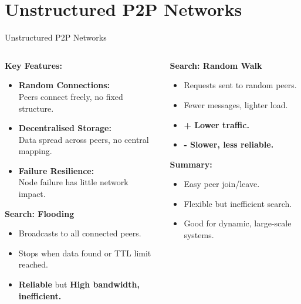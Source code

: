 \documentclass[aspectratio=169, table]{beamer}
\begin{document}
\section{Unstructured P2P Networks}

\begin{frame}{Unstructured P2P Networks}
	\vspace{20pt}
	\begin{columns}[t]
		
		\begin{column}{0.6\textwidth}
			\textbf{Key Features:}
			\begin{itemize}
				\item \textbf{Random Connections:} \\
				Peers connect freely, no fixed structure.
				
				\item \textbf{Decentralised Storage:} \\
				Data spread across peers, no central mapping.
				
				\item \textbf{Failure Resilience:} \\
				Node failure has little network impact.
			\end{itemize}
			
			\textbf{Search: Flooding}
			\begin{itemize}
				\item Broadcasts to all connected peers.
				\item Stops when data found or TTL limit reached.
				\item \textbf{Reliable} but \textbf{High bandwidth, inefficient.}
			\end{itemize}
		\end{column}
		
		\begin{column}{0.4\textwidth}
			\textbf{Search: Random Walk}
			\begin{itemize}
				\item Requests sent to random peers.
				\item Fewer messages, lighter load.
				\item \textbf{+ Lower traffic.}
				\item \textbf{- Slower, less reliable.}
			\end{itemize}
			
			\vspace{10pt}
			\textbf{Summary:}
			\begin{itemize}
				\item Easy peer join/leave.
				\item Flexible but inefficient search.
				\item Good for dynamic, large-scale systems.
			\end{itemize}
		\end{column}
		
	\end{columns}
\end{frame}
\end{document}
